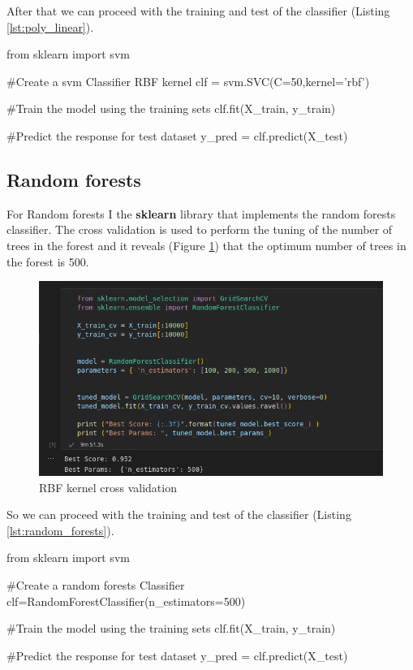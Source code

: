 \documentclass[12pt]{article}
\begin{document}
After that we can proceed with the training and test of the classifier 
(Listing \ref{lst:poly_linear}).

\begin{python}[caption={SVM RBF kernel},label={lst:rbf_linear}]
from sklearn import svm

#Create a svm Classifier RBF kernel
clf = svm.SVC(C=50,kernel='rbf') 

#Train the model using the training sets
clf.fit(X_train, y_train)

#Predict the response for test dataset
y_pred = clf.predict(X_test)
\end{python}


\subsection{Random forests}
For Random forests I the \textbf{sklearn} library that implements the random 
forests classifier.
The cross validation is used to perform the tuning of the number of trees in the 
forest and it reveals (Figure \ref{fig:rf_cross}) that the optimum number of trees in the forest is 500.

\begin{figure}[H]
    \centering
    \includegraphics[scale=0.54]{rf_cross.png}
    \caption{RBF kernel cross validation}
    \label{fig:rf_cross}
\end{figure}

So we can proceed with the training and test of the classifier 
(Listing \ref{lst:random_forests}).

\begin{python}[caption={Random forests},label={lst:random_forests}]
from sklearn import svm

#Create a random forests Classifier
clf=RandomForestClassifier(n_estimators=500)

#Train the model using the training sets
clf.fit(X_train, y_train)

#Predict the response for test dataset
y_pred = clf.predict(X_test)
\end{python}
\end{document}
